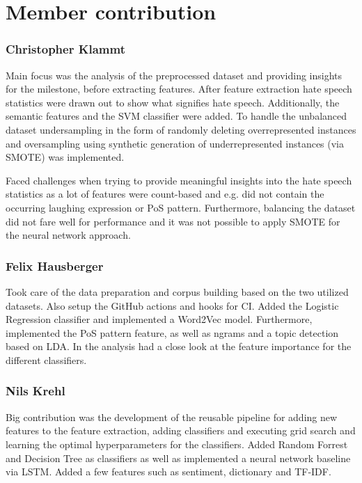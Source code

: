 \section*{Member contribution}

\subsubsection*{Christopher Klammt}

Main focus was the analysis of the preprocessed dataset and providing insights for the milestone, before extracting features. After feature extraction hate speech statistics were drawn out to show what signifies hate speech. Additionally, the semantic features and the SVM classifier were added. To handle the unbalanced dataset undersampling in the form of randomly deleting overrepresented instances and oversampling using synthetic generation of underrepresented instances (via SMOTE) was implemented.

Faced challenges when trying to provide meaningful insights into the hate speech statistics as a lot of features were count-based and e.g. did not contain the occurring laughing expression or PoS pattern. Furthermore, balancing the dataset did not fare well for performance and it was not possible to apply SMOTE for the neural network approach.

\subsubsection*{Felix Hausberger}

Took care of the data preparation and corpus building based on the two utilized datasets. Also setup the GitHub actions and hooks for CI. Added the Logistic Regression classifier and implemented a Word2Vec model. Furthermore, implemented the PoS pattern feature, as well as ngrams and a topic detection based on LDA. In the analysis had a close look at the feature importance for the different classifiers.


\subsubsection*{Nils Krehl}

Big contribution was the development of the reusable pipeline for adding new features to the feature extraction, adding classifiers and executing grid search and learning the optimal hyperparameters for the classifiers. Added Random Forrest and Decision Tree as classifiers as well as implemented a neural network baseline via LSTM. Added a few features such as sentiment, dictionary and TF-IDF.


